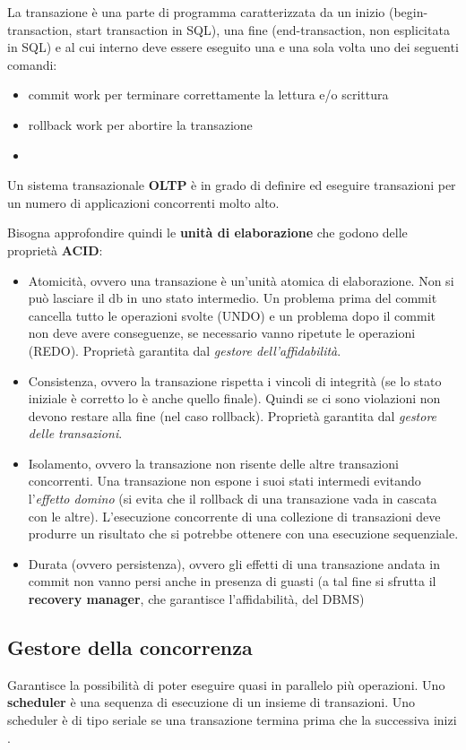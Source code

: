 La transazione è una parte di programma caratterizzata da un inizio (begin-transaction, start transaction in SQL), una fine (end-transaction, non esplicitata in SQL) e al cui interno deve essere eseguito una e una sola volta uno dei seguenti comandi:
\begin{itemize}
    \item commit work  per terminare correttamente la lettura e/o  scrittura 
    \item rollback work per abortire la transazione
    \item 
\end{itemize}
Un sistema transazionale \textbf{OLTP} è in grado di definire ed eseguire transazioni per un numero di applicazioni concorrenti molto alto. 

Bisogna approfondire quindi le \textbf{unità di elaborazione} che godono delle proprietà  \textbf{ACID}:
\begin{itemize}
  \item Atomicità, ovvero una transazione è un'unità atomica di elaborazione. Non si può lasciare il db in uno stato intermedio. Un problema prima del commit cancella tutto le operazioni svolte (UNDO) e un problema dopo il commit non deve avere conseguenze, se  necessario vanno ripetute le operazioni (REDO). Proprietà garantita dal \textit{gestore dell’affidabilità}.
  \item Consistenza, ovvero la transazione rispetta i vincoli di integrità (se lo stato iniziale è corretto lo è anche quello finale). Quindi se ci sono violazioni non devono restare alla fine (nel caso rollback). Proprietà garantita dal \textit{gestore delle transazioni}.
  \item Isolamento, ovvero la transazione non risente delle altre transazioni concorrenti. Una transazione non espone i suoi stati intermedi evitando l'\textit{effetto domino} (si evita che il rollback di una transazione vada in cascata con le altre). L'esecuzione concorrente di una collezione di transazioni deve produrre un risultato che si potrebbe ottenere con una esecuzione sequenziale.
  \item Durata (ovvero persistenza), ovvero gli effetti di una transazione andata in commit non vanno persi anche in presenza di guasti (a tal fine si sfrutta il \textbf{recovery manager}, che garantisce l'affidabilità, del DBMS)
\end{itemize}
 
 \subsection{Gestore della concorrenza}
 Garantisce la possibilità di poter eseguire quasi in parallelo più operazioni.
 Uno \textbf{scheduler} è una sequenza di esecuzione di un insieme di transazioni. Uno scheduler è di tipo seriale se una transazione termina prima che la successiva inizi .

